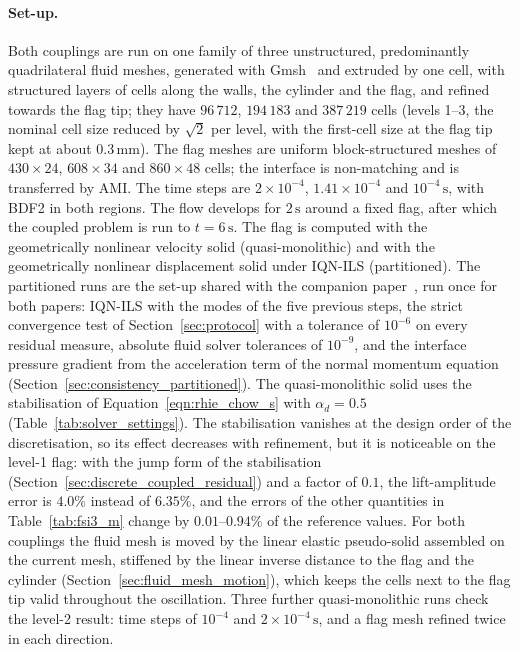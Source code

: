\paragraph{Set-up.}
Both couplings are run on one family of three unstructured, predominantly quadrilateral fluid meshes, generated with Gmsh~\citep{Geuzaine2009} and extruded by one cell, with structured layers of cells along the walls, the cylinder and the flag, and refined towards the flag tip; they have $96\,712$, $194\,183$ and $387\,219$ cells (levels 1--3, the nominal cell size reduced by $\sqrt{2}$ per level, with the first-cell size at the flag tip kept at about $0.3\,\mathrm{mm}$).
The flag meshes are uniform block-structured meshes of $430\times24$, $608\times34$ and $860\times48$ cells; the interface is non-matching and is transferred by AMI.
The time steps are $2\times10^{-4}$, $1.41\times10^{-4}$ and $10^{-4}\,\mathrm{s}$, with BDF2 in both regions.
The flow develops for $2\,\mathrm{s}$ around a fixed flag, after which the coupled problem is run to $t = 6\,\mathrm{s}$.
The flag is computed with the geometrically nonlinear velocity solid (quasi-monolithic) and with the geometrically nonlinear displacement solid under IQN-ILS (partitioned).
The partitioned runs are the set-up shared with the companion paper~\citep{CardiffFSIVerification2026}, run once for both papers: IQN-ILS with the modes of the five previous steps, the strict convergence test of Section~\ref{sec:protocol} with a tolerance of $10^{-6}$ on every residual measure, absolute fluid solver tolerances of $10^{-9}$, and the interface pressure gradient from the acceleration term of the normal momentum equation (Section~\ref{sec:consistency_partitioned}).
The quasi-monolithic solid uses the stabilisation of Equation~\eqref{eqn:rhie_chow_s} with $\alpha_d = 0.5$ (Table~\ref{tab:solver_settings}).
The stabilisation vanishes at the design order of the discretisation, so its effect decreases with refinement, but it is noticeable on the level-1 flag: with the jump form of the stabilisation (Section~\ref{sec:discrete_coupled_residual}) and a factor of $0.1$, the lift-amplitude error is $4.0\%$ instead of $6.35\%$, and the errors of the other quantities in Table~\ref{tab:fsi3_m} change by $0.01$--$0.94\%$ of the reference values.
For both couplings the fluid mesh is moved by the linear elastic pseudo-solid assembled on the current mesh, stiffened by the linear inverse distance to the flag and the cylinder (Section~\ref{sec:fluid_mesh_motion}), which keeps the cells next to the flag tip valid throughout the oscillation.
Three further quasi-monolithic runs check the level-2 result: time steps of $10^{-4}$ and $2\times10^{-4}\,\mathrm{s}$, and a flag mesh refined twice in each direction.

